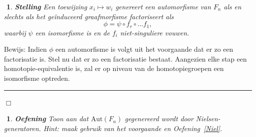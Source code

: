 \documentclass[12pt]{book}
\newcommand{\bew}{{\sc Bewijs: }}
\newcommand{\B}{\rule{1mm}{0mm} \hfill $\Box$ }
\newtheorem{stelh}{$\!\!$}[section]
\newenvironment{stel}{\begin{stelh}{\em {\bf Stelling }}}{\end{stelh}}
\newtheorem{eoef}{$\!\!$}[chapter]
\newenvironment{oef}{\begin{eoef} {\bf Oefening}}{\end{eoef}}
\begin{document}
\begin{stel}
Een toewijzing $x_i \mapsto w_i$ genereert een automorfisme van $F_n$ als en slechts als het ge\"induceerd graafmorfisme factoriseert als $$\phi = \psi \circ f_r \circ \dots f_1,$$ waarbij $\psi$ een isomorfisme is en de $f_i$ niet-singuliere vouwen.
\end{stel}
\bew
Indien $\phi$ een automorfisme is volgt uit het voorgaande dat er zo een factorisatie is. Stel nu dat er zo een factorisatie bestaat. Aangezien elke stap een homotopie-equivalentie is, zal er op niveau van de homotopiegroepen een isomorfisme optreden.
\B

\begin{oef}
Toon aan dat $\mathrm{Aut}(F_n)$ gegenereerd wordt door Nielsen-generatoren. Hint: maak gebruik van het voorgaande en Oefening~\ref{Niel}.
\end{oef}
\end{document}
